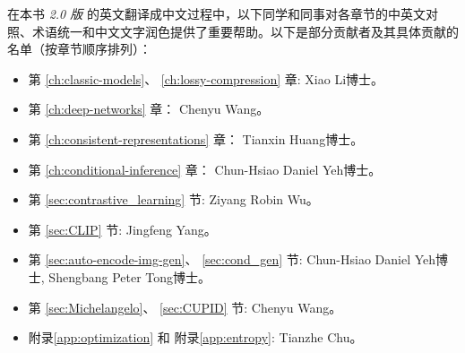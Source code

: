 \documentclass[../../book-main.tex]{subfiles}
\begin{document}
在本书 {\em 2.0 版} 的英文翻译成中文过程中，以下同学和同事对各章节的中英文对照、术语统一和中文文字润色提供了重要帮助。以下是部分贡献者及其具体贡献的名单（按章节顺序排列）：
\begin{itemize}
	\item 第 \ref{ch:classic-models}、 \ref{ch:lossy-compression} 章: Xiao Li博士。
	\item 第 \ref{ch:deep-networks} 章： Chenyu Wang。
	\item 第 \ref{ch:consistent-representations} 章： Tianxin Huang博士。
	\item 第 \ref{ch:conditional-inference} 章： Chun-Hsiao Daniel Yeh博士。
	\item 第 \ref{sec:contrastive_learning} 节: Ziyang Robin Wu。	
	\item 第 \ref{sec:CLIP} 节: Jingfeng Yang。
	\item 第 \ref{sec:auto-encode-img-gen}、 \ref{sec:cond_gen} 节: Chun-Hsiao Daniel Yeh博士, Shengbang Peter Tong博士。
	\item 第 \ref{sec:Michelangelo}、 \ref{sec:CUPID} 节: Chenyu Wang。
	\item 附录\ref{app:optimization} 和 附录\ref{app:entropy}: Tianzhe Chu。
\end{itemize}
\end{document}
